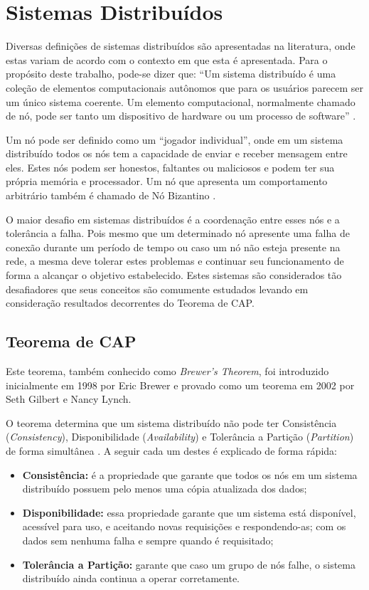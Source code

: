 \section{Sistemas Distribuídos}

    Diversas definições de sistemas distribuídos são apresentadas na literatura, onde estas variam de acordo com o contexto em que esta é apresentada. Para o propósito deste trabalho, pode-se dizer que: “Um sistema distribuído é uma coleção de elementos computacionais autônomos que para os usuários parecem ser um único sistema coerente. Um elemento computacional, normalmente chamado de nó, pode ser tanto um dispositivo de hardware ou um processo de software” \cite{sistemas_distribuidos_tanembaum}.

    Um nó pode ser definido como um “jogador individual”, onde em um sistema distribuído todos os nós tem a capacidade de enviar e receber mensagem entre eles. Estes nós podem ser honestos, faltantes ou maliciosos e podem ter sua própria memória e processador. Um nó que apresenta um comportamento arbitrário também é chamado de Nó Bizantino \cite{mastering_blockchain}.

    O maior desafio em sistemas distribuídos é a coordenação entre esses nós e a tolerância a falha. Pois mesmo que um determinado nó apresente uma falha de conexão durante um período de tempo ou caso um nó não esteja presente na rede, a mesma deve tolerar estes problemas e continuar seu funcionamento de forma a alcançar o objetivo estabelecido. Estes sistemas 
    são considerados tão desafiadores que seus conceitos são comumente estudados levando em consideração resultados decorrentes do Teorema de CAP.

    \subsection{Teorema de CAP}

        Este teorema, também conhecido como \textit{Brewer's Theorem}, foi introduzido inicialmente em 1998 por Eric Brewer e provado como um teorema em 2002 por Seth Gilbert e Nancy Lynch.

        O teorema determina que um sistema distribuído não pode ter Consistência (\textit{Consistency}), Disponibilidade (\textit{Availability}) e Tolerância a Partição (\textit{Partition}) de forma simultânea \cite{brewer_distributed}. A seguir cada um destes é explicado de forma rápida:

        \begin{itemize}
            \item \textbf{Consistência:} é a propriedade que garante que todos os nós em um sistema distribuído possuem pelo menos uma cópia atualizada dos dados;
            \item \textbf{Disponibilidade:} essa propriedade garante que um sistema está disponível, acessível para uso, e aceitando novas requisições e respondendo-as;
        com os dados sem nenhuma falha e sempre quando é requisitado;
            \item \textbf{Tolerância a Partição:} garante que caso um grupo de nós falhe, o sistema distribuído ainda continua a operar corretamente.
        \end{itemize}

